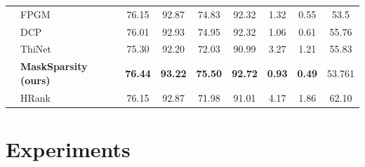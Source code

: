 \documentclass[review]{cvpr}
\begin{document}
\begin{table}
\begin{center}
\begin{small}
\begin{tabular}{llccccccc}
				&FPGM \cite{FPGM}				&	76.15	&	92.87	&	74.83	&	92.32	&	1.32	&	0.55	&	53.5	\\
				&DCP \cite{zhuang2018discrimination}&76.01 	&	92.93	&	74.95	&	92.32	&	1.06 	&	0.61 	&	55.76	\\		
				&ThiNet \cite{DBLP:journals/pami/LuoZZXWL19}&	75.30	&	92.20	&	72.03	&	90.99	&	3.27 	&	1.21 	&	55.83	\\
				&\textbf{MaskSparsity (ours)}	&	\textbf{76.44}	&	\textbf{93.22}	&	\textbf{75.50}	&	\textbf{92.72}	&	\textbf{0.93}	&	\textbf{0.49}	&	53.761	\\
				
				
				
				
				&HRank \cite{HRank}				&	76.15	&	92.87	&	71.98	&	91.01	&	4.17	&	1.86	&	62.10	\\
				\bottomrule
				
			\end{tabular}
		\end{small}
	\end{center}
	\vspace{-0.1in}
	\label{exp-table-imgnet}
\end{table}
\section{Experiments}\label{Experiment}
\end{document}
